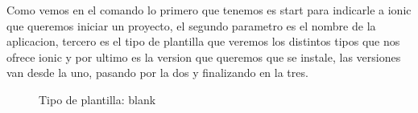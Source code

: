 \documentclass[a4paper, 11pt]{article}
\begin{document}
\begin{itemize}
            Como vemos en el comando lo primero que tenemos es start para indicarle
            a ionic que queremos iniciar un proyecto, el segundo parametro es el
            nombre de la aplicacion, tercero es el tipo de plantilla que veremos los
            distintos tipos que nos ofrece ionic y por ultimo es la version que
            queremos que se instale, las versiones van desde la uno, pasando por la
            dos y finalizando en la tres.


                   \begin{figure}[H]
                     \centering
                      \caption{Tipo de plantilla: blank}
                      \label{f:blank}
                    \end{figure}



\end{itemize}
\end{document}
